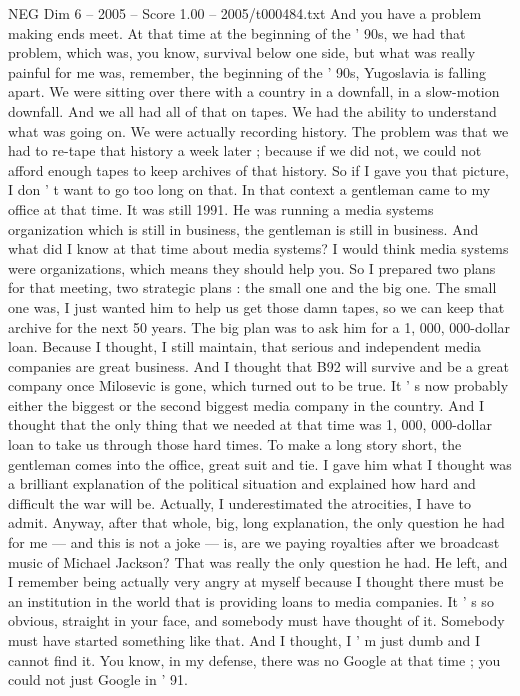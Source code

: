 \begin{textsample}{NEG Dim 6 – 2005 – Score 1.00 – 2005/t000484.txt}
And you have a problem making ends meet.
At that time at the beginning of the ' 90s, we had that problem, which was, you know, survival below one side, but what was really painful for me was, remember, the beginning of the ' 90s, Yugoslavia is falling apart.
We were sitting over there with a country in a downfall, in a slow-motion downfall.
And we all had all of that on tapes.
We had the ability to understand what was going on.
We were actually recording history.
The problem was that we had to re-tape that history a week later ; because if we did not, we could not afford enough tapes to keep archives of that history.
So if I gave you that picture, I don ' t want to go too long on that.
In that context a gentleman came to my office at that time.
It was still 1991.
He was running a media systems organization which is still in business, the gentleman is still in business.
And what did I know at that time about media systems?
I would think media systems were organizations, which means they should help you.
So I prepared two plans for that meeting, two strategic plans : the small one and the big one.
The small one was, I just wanted him to help us get those damn tapes, so we can keep that archive for the next 50 years.
The big plan was to ask him for a 1, 000, 000-dollar loan.
Because I thought, I still maintain, that serious and independent media companies are great business.
And I thought that B92 will survive and be a great company once Milosevic is gone, which turned out to be true.
It ' s now probably either the biggest or the second biggest media company in the country.
And I thought that the only thing that we needed at that time was 1, 000, 000-dollar loan to take us through those hard times.
To make a long story short, the gentleman comes into the office, great suit and tie.
I gave him what I thought was a brilliant explanation of the political situation and explained how hard and difficult the war will be.
Actually, I underestimated the atrocities, I have to admit.
Anyway, after that whole, big, long explanation, the only question he had for me — and this is not a joke — is, are we paying royalties after we broadcast music of Michael Jackson?
That was really the only question he had.
He left, and I remember being actually very angry at myself because I thought there must be an institution in the world that is providing loans to media companies.
It ' s so obvious, straight in your face, and somebody must have thought of it.
Somebody must have started something like that.
And I thought, I ' m just dumb and I cannot find it.
You know, in my defense, there was no Google at that time ; you could not just Google in ' 91.

\end{textsample}
